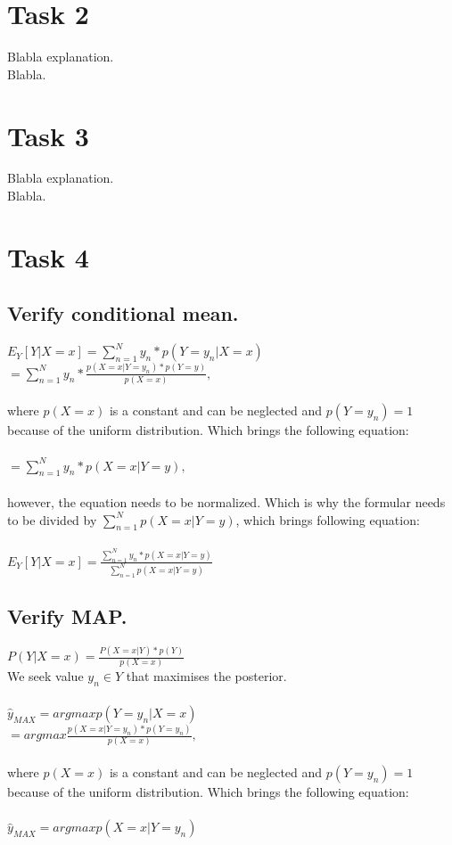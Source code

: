 \documentclass{article}
\begin{document}
\section{Task 2}
Blabla explanation.\\
Blabla.

\section{Task 3}
Blabla explanation.\\
Blabla.

\section{Task 4}
\subsection{Verify conditional mean.}
$E_Y [Y | X = x] = \sum_{n=1}^{N} y_n * p(Y = y_n | X = x)$\\
$ = \sum_{n=1}^{N} y_n * \frac{p(X = x | Y = y_n) * p(Y = y)}{p(X=x)},$\\\\
where $p(X = x)$ is a constant and can be neglected and $p(Y = y_n) = 1$ because of the uniform distribution. Which brings the following equation:\\\\
$ = \sum_{n=1}^{N} y_n * p(X = x | Y = y),$\\\\
however, the equation needs to be normalized. Which is why the formular needs to be divided by $\sum_{n=1}^{N} p(X = x | Y = y)$, which brings following equation:\\\\
$E_Y [Y | X = x] = \frac{\sum_{n=1}^{N} y_n *  p(X = x | Y = y)}{\sum_{n=1}^{N} p(X = x | Y = y)}$



\subsection{Verify MAP.}
$P(Y | X = x) = \frac{P( X = x | Y) * p(Y)}{p(X = x)}$\\
We seek value $y_n \in Y$ that maximises the posterior.\\\\
$\hat{y}_{MAX} = argmax p(Y = y_n | X = x)$\\
$ = argmax \frac{p(X = x | Y = y_n) * p(Y = y_n)}{p(X = x)},$\\\\
where $p(X = x)$ is a constant and can be neglected and $p(Y=y_n) = 1$ because of the uniform distribution. Which brings the following equation:\\\\
$\hat{y}_{MAX} = argmax p(X = x | Y = y_n)$\\
\end{document}
